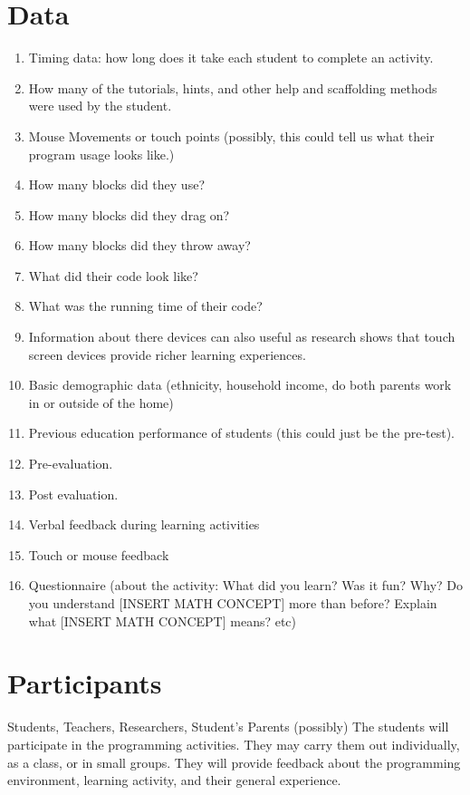 \documentclass[12pt]{article}
\begin{document}
\section*{Data}
\begin{enumerate}
    \item Timing data: how long does it take each student to complete an activity.
    \item How many of the tutorials, hints, and other help and scaffolding methods were used by the student. 
    \item Mouse Movements or touch points (possibly, this could tell us what their program usage looks like.)
    \item How many blocks did they use?
    \item How many blocks did they drag on? 
    \item How many blocks did they throw away?
    \item What did their code look like? 
    \item What was the running time of their code?  
    \item Information about there devices can also useful as research shows that touch screen devices provide richer learning experiences.
    \item Basic demographic data (ethnicity, household income, do both parents work in or outside of the home)
    \item Previous education performance of students (this could just be the pre-test).
    \item Pre-evaluation.
    \item Post evaluation.
    \item Verbal feedback during learning activities
    \item Touch or mouse feedback
    \item Questionnaire (about the activity: What did you learn? Was it fun? Why? Do you understand [INSERT MATH CONCEPT] more than before? Explain what [INSERT MATH CONCEPT] means? etc)
\end{enumerate}

\section*{Participants}
Students, Teachers, Researchers, Student's Parents (possibly)
The students will participate in the programming activities. They may carry them out individually, as a class, or in small groups. They will provide feedback about the programming environment, learning activity, and their general experience.
\end{document}
